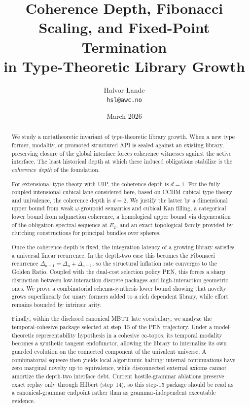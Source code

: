 \documentclass[11pt,a4paper]{article}
\title{\textbf{Coherence Depth, Fibonacci Scaling, and Fixed-Point Termination\\
in Type-Theoretic Library Growth}}
\author{Halvor Lande\\
\texttt{hsl@awc.no}}
\date{March 2026}
\theoremstyle{plain}
\theoremstyle{definition}
\theoremstyle{remark}
\begin{document}
\maketitle

\begin{abstract}
We study a metatheoretic invariant of type-theoretic library growth.  When a new type former, modality, or promoted structured API is sealed against an existing library, preserving closure of the global interface forces coherence witnesses against the active interface.  The least historical depth at which these induced obligations stabilize is the \emph{coherence depth} of the foundation.

For extensional type theory with UIP, the coherence depth is $d=1$.  For the fully coupled intensional cubical lane considered here, based on CCHM cubical type theory and univalence, the coherence depth is $d=2$.  We justify the latter by a dimensional upper bound from weak $\omega$-groupoid semantics and cubical Kan filling, a categorical lower bound from adjunction coherence, a homological upper bound via degeneration of the obligation spectral sequence at $E_2$, and an exact topological family provided by clutching constructions for principal bundles over spheres.

Once the coherence depth is fixed, the integration latency of a growing library satisfies a universal linear recurrence.  In the depth-two case this becomes the Fibonacci recurrence $\Delta_{n+1}=\Delta_n+\Delta_{n-1}$, so the structural inflation rate converges to the Golden Ratio.  Coupled with the dual-cost selection policy PEN, this forces a sharp distinction between low-interaction discrete packages and high-interaction geometric ones.  We prove a combinatorial schema-synthesis lower bound showing that novelty grows superlinearly for unary formers added to a rich dependent library, while effort remains bounded by intrinsic arity.

Finally, within the disclosed canonical MBTT late vocabulary, we analyze the temporal-cohesive package selected at step~15 of the PEN trajectory.  Under a model-theoretic representability hypothesis in a cohesive $\infty$-topos, its temporal modality becomes a synthetic tangent endofunctor, allowing the library to internalize its own guarded evolution on the connected component of the univalent universe.  A combinatorial squeeze then yields local algorithmic halting: internal continuations have zero marginal novelty up to equivalence, while disconnected external axioms cannot amortize the depth-two interface debt.  Current hostile-grammar ablations preserve exact replay only through Hilbert (step~14), so this step-15 package should be read as a canonical-grammar endpoint rather than as grammar-independent executable evidence.
\end{abstract}
\end{document}

